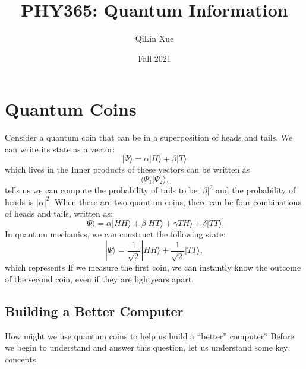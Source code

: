 \documentclass{article}
\title{PHY365: Quantum Information}
\author{QiLin Xue}
\date{Fall 2021}
\numberwithin{equation}{section}
\begin{document}
\maketitle
\tableofcontents
\newpage
\section{Quantum Coins}
Consider a quantum coin that can be in a superposition of heads and tails. We can write its state as a vector:
\begin{equation}
    |\Psi\rangle = \alpha|H\rangle + \beta|T\rangle  
\end{equation}
which lives in the  Inner products of these vectors can be written as 
\begin{equation}
    \langle \Psi_1 | \Psi_2 \rangle.
\end{equation}
 tells us we can compute the probability of tails to be $|\beta|^2$ and the probability of heads is $|\alpha|^2$. When there are two quantum coins, there can be four combinations of heads and tails, written as:
\begin{equation}
    |\Psi\rangle = \alpha|HH\rangle + \beta|HT\rangle + \gamma TH\rangle + \delta |TT\rangle.
\end{equation}
In quantum mechanics, we can construct the following state:
\begin{equation}
    |\Psi\rangle = \frac{1}{\sqrt{2}}|HH\rangle + \frac{1}{\sqrt{2}}|TT\rangle,
\end{equation}
which represents  If we measure the first coin, we can instantly know the outcome of the second coin, even if they are lightyears apart.
\subsection{Building a Better Computer}
How might we use quantum coins to help us build a ``better'' computer? Before we begin to understand and answer this question, let us understand some key concepts.
\end{document}
